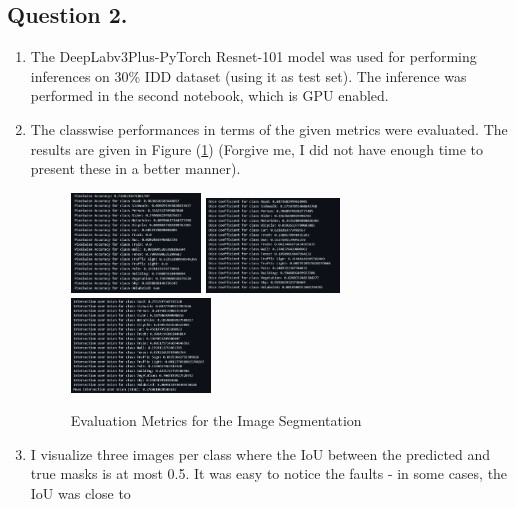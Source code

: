 \documentclass[10pt]{article}
\begin{document}
    \subsection*{\textbf{Question 2.}}
    \begin{enumerate}[label=(\alph*)]
        \item The DeepLabv3Plus-PyTorch Resnet-101 model was used for performing inferences
        on 30\% IDD dataset (using it as test set). The inference was performed in the second
        notebook, which is GPU enabled.
        \item The classwise performances in terms of the given metrics were evaluated. The results
        are given in Figure (\ref{fig:metrics-screenshot}) (Forgive me, I did not have enough time to
        present these in a better manner).
        \begin{figure}[h!]
            \centering
            \includegraphics[width=0.325\textwidth]{Assets/Segmentation/Metrics/01}
            \includegraphics[width=0.335\textwidth]{Assets/Segmentation/Metrics/02}
            \includegraphics[width=0.35\textwidth]{Assets/Segmentation/Metrics/03}
            \caption{Evaluation Metrics for the Image Segmentation}
            \label{fig:metrics-screenshot}
        \end{figure}
        \item I visualize three images per class where the IoU between the predicted and true
        masks is at most 0.5. It was easy to notice the faults - in some cases, the IoU was close to

\end{enumerate}
\end{document}
